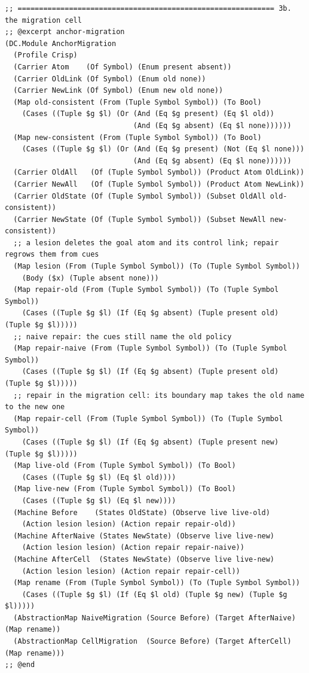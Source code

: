 \documentclass[11pt]{article}
\theoremstyle{definition}
\theoremstyle{plain}
\begin{document}
\begin{lstlisting}[style=mettafull]
;; ============================================================ 3b. the migration cell
;; @excerpt anchor-migration
(DC.Module AnchorMigration
  (Profile Crisp)
  (Carrier Atom    (Of Symbol) (Enum present absent))
  (Carrier OldLink (Of Symbol) (Enum old none))
  (Carrier NewLink (Of Symbol) (Enum new old none))
  (Map old-consistent (From (Tuple Symbol Symbol)) (To Bool)
    (Cases ((Tuple $g $l) (Or (And (Eq $g present) (Eq $l old))
                              (And (Eq $g absent) (Eq $l none))))))
  (Map new-consistent (From (Tuple Symbol Symbol)) (To Bool)
    (Cases ((Tuple $g $l) (Or (And (Eq $g present) (Not (Eq $l none)))
                              (And (Eq $g absent) (Eq $l none))))))
  (Carrier OldAll   (Of (Tuple Symbol Symbol)) (Product Atom OldLink))
  (Carrier NewAll   (Of (Tuple Symbol Symbol)) (Product Atom NewLink))
  (Carrier OldState (Of (Tuple Symbol Symbol)) (Subset OldAll old-consistent))
  (Carrier NewState (Of (Tuple Symbol Symbol)) (Subset NewAll new-consistent))
  ;; a lesion deletes the goal atom and its control link; repair regrows them from cues
  (Map lesion (From (Tuple Symbol Symbol)) (To (Tuple Symbol Symbol))
    (Body ($x) (Tuple absent none)))
  (Map repair-old (From (Tuple Symbol Symbol)) (To (Tuple Symbol Symbol))
    (Cases ((Tuple $g $l) (If (Eq $g absent) (Tuple present old) (Tuple $g $l)))))
  ;; naive repair: the cues still name the old policy
  (Map repair-naive (From (Tuple Symbol Symbol)) (To (Tuple Symbol Symbol))
    (Cases ((Tuple $g $l) (If (Eq $g absent) (Tuple present old) (Tuple $g $l)))))
  ;; repair in the migration cell: its boundary map takes the old name to the new one
  (Map repair-cell (From (Tuple Symbol Symbol)) (To (Tuple Symbol Symbol))
    (Cases ((Tuple $g $l) (If (Eq $g absent) (Tuple present new) (Tuple $g $l)))))
  (Map live-old (From (Tuple Symbol Symbol)) (To Bool)
    (Cases ((Tuple $g $l) (Eq $l old))))
  (Map live-new (From (Tuple Symbol Symbol)) (To Bool)
    (Cases ((Tuple $g $l) (Eq $l new))))
  (Machine Before    (States OldState) (Observe live live-old)
    (Action lesion lesion) (Action repair repair-old))
  (Machine AfterNaive (States NewState) (Observe live live-new)
    (Action lesion lesion) (Action repair repair-naive))
  (Machine AfterCell  (States NewState) (Observe live live-new)
    (Action lesion lesion) (Action repair repair-cell))
  (Map rename (From (Tuple Symbol Symbol)) (To (Tuple Symbol Symbol))
    (Cases ((Tuple $g $l) (If (Eq $l old) (Tuple $g new) (Tuple $g $l)))))
  (AbstractionMap NaiveMigration (Source Before) (Target AfterNaive) (Map rename))
  (AbstractionMap CellMigration  (Source Before) (Target AfterCell)  (Map rename)))
;; @end


\end{lstlisting}
\end{document}
